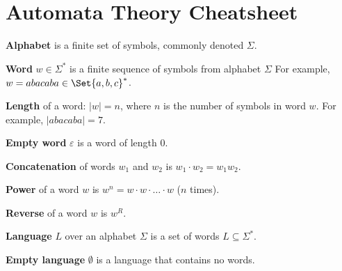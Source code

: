 \documentclass[a4paper,10pt]{article}
\begin{document}

\setcounter{section}{5}%
\section{Automata Theory Cheatsheet}

\begin{terms}
    \item \textbf{Alphabet} is a finite set of symbols, commonly denoted $\Sigma$.

    \item \textbf{Word} $w \in \Sigma^*$ is a finite sequence of symbols from alphabet $\Sigma$
    For example, $w = abacaba \in \Set{a, b, c}^*$.

    \item \textbf{Length} of a word: $|w| = n$, where $n$ is the number of symbols in word $w$.
    For example, $|abacaba| = 7$.

    \item \textbf{Empty word} $\varepsilon$ is a word of length 0.

    \item \textbf{Concatenation} of words $w_1$ and $w_2$ is $w_1 \cdot w_2 = w_1 w_2$.

    \item \textbf{Power} of a word $w$ is $w^n = w \cdot w \cdot \ldots \cdot w$ ($n$ times).

    \item \textbf{Reverse} of a word $w$ is $w^R$.




    \item \textbf{Language} $L$ over an alphabet $\Sigma$ is a set of words $L \subseteq \Sigma^*$.

    \item \textbf{Empty language} $\emptyset$ is a language that contains no words.


\end{terms}
\end{document}

